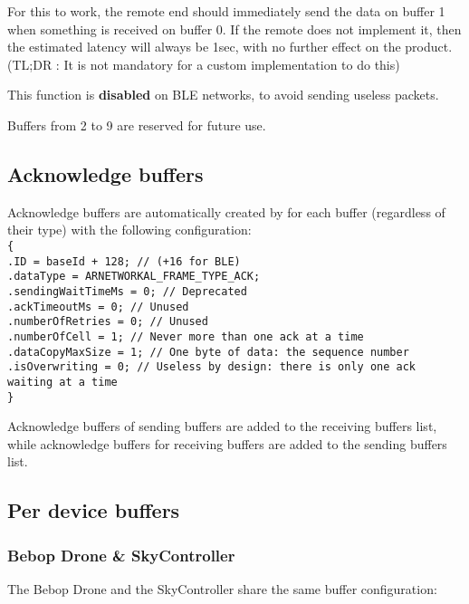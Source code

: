For this to work, the remote end should immediately send the data on buffer 1 when something is received on buffer 0. If the remote does not implement it, then the estimated latency will always be 1sec, with no further effect on the product. (TL;DR : It is not mandatory for a custom implementation to do this)

This function is \textbf{disabled} on BLE networks, to avoid sending useless packets.

Buffers from 2 to 9 are reserved for future use.

\subsection{Acknowledge buffers}

Acknowledge buffers are automatically created by  for each buffer (regardless of their type) with the following configuration:\\
\texttt{\{\\
    .ID = baseId + 128; // (+16 for BLE)\\
    .dataType = ARNETWORKAL\_FRAME\_TYPE\_ACK;\\
    .sendingWaitTimeMs = 0; // Deprecated\\
    .ackTimeoutMs = 0; // Unused\\
    .numberOfRetries = 0; // Unused\\
    .numberOfCell = 1; // Never more than one ack at a time\\
    .dataCopyMaxSize = 1; // One byte of data: the sequence number\\
    .isOverwriting = 0; // Useless by design: there is only one ack waiting at a time\\
\}}

Acknowledge buffers of sending buffers are added to the receiving buffers list, while acknowledge buffers for receiving buffers are added to the sending buffers list.

\subsection{Per device buffers}

\subsubsection{Bebop Drone \& SkyController}

The Bebop Drone and the SkyController share the same buffer configuration:

